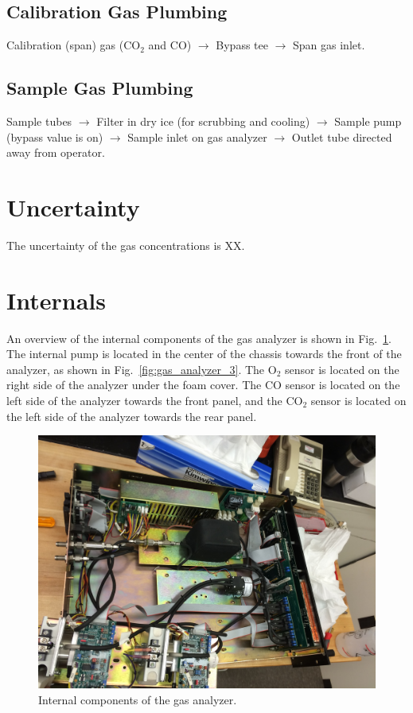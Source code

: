 \documentclass[11pt,oneside]{book}
\begin{document}
\subsection{Calibration Gas Plumbing}

Calibration (span) gas (CO$_2$ and CO) $\rightarrow$ Bypass tee $\rightarrow$ Span gas inlet.

\subsection{Sample Gas Plumbing}

Sample tubes $\rightarrow$ Filter in dry ice (for scrubbing and cooling) $\rightarrow$ Sample pump (bypass value is on) $\rightarrow$ Sample inlet on gas analyzer $\rightarrow$ Outlet tube directed away from operator.

\section{Uncertainty}

The uncertainty of the gas concentrations is XX.

\section{Internals}

An overview of the internal components of the gas analyzer is shown in Fig.~\ref{fig:gas_analyzer_5}. The internal pump is located in the center of the chassis towards the front of the analyzer, as shown in Fig.~\ref{fig:gas_analyzer_3}. The O$_2$ sensor is located on the right side of the analyzer under the foam cover. The CO sensor is located on the left side of the analyzer towards the front panel, and the CO$_2$ sensor is located on the left side of the analyzer towards the rear panel.

\begin{figure}[h!]
\includegraphics[width=5in]{../Equipment/Gas_Analyzer/Figures/gas_analyzer_5}
\caption{Internal components of the gas analyzer.}
\label{fig:gas_analyzer_5}
\end{figure}
\end{document}
